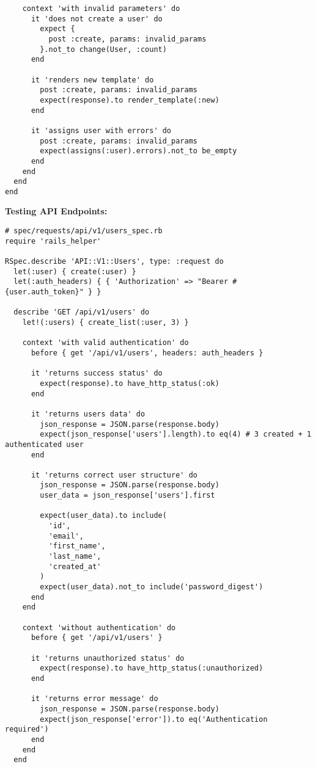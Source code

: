 \documentclass[12pt,a4paper]{article}
\begin{document}
\begin{lstlisting}
    context 'with invalid parameters' do
      it 'does not create a user' do
        expect {
          post :create, params: invalid_params
        }.not_to change(User, :count)
      end

      it 'renders new template' do
        post :create, params: invalid_params
        expect(response).to render_template(:new)
      end

      it 'assigns user with errors' do
        post :create, params: invalid_params
        expect(assigns(:user).errors).not_to be_empty
      end
    end
  end
end
\end{lstlisting}

\textbf{Testing API Endpoints:}
\begin{lstlisting}
# spec/requests/api/v1/users_spec.rb
require 'rails_helper'

RSpec.describe 'API::V1::Users', type: :request do
  let(:user) { create(:user) }
  let(:auth_headers) { { 'Authorization' => "Bearer #{user.auth_token}" } }

  describe 'GET /api/v1/users' do
    let!(:users) { create_list(:user, 3) }

    context 'with valid authentication' do
      before { get '/api/v1/users', headers: auth_headers }

      it 'returns success status' do
        expect(response).to have_http_status(:ok)
      end

      it 'returns users data' do
        json_response = JSON.parse(response.body)
        expect(json_response['users'].length).to eq(4) # 3 created + 1 authenticated user
      end

      it 'returns correct user structure' do
        json_response = JSON.parse(response.body)
        user_data = json_response['users'].first
        
        expect(user_data).to include(
          'id',
          'email',
          'first_name',
          'last_name',
          'created_at'
        )
        expect(user_data).not_to include('password_digest')
      end
    end

    context 'without authentication' do
      before { get '/api/v1/users' }

      it 'returns unauthorized status' do
        expect(response).to have_http_status(:unauthorized)
      end

      it 'returns error message' do
        json_response = JSON.parse(response.body)
        expect(json_response['error']).to eq('Authentication required')
      end
    end
  end


\end{lstlisting}
\end{document}
